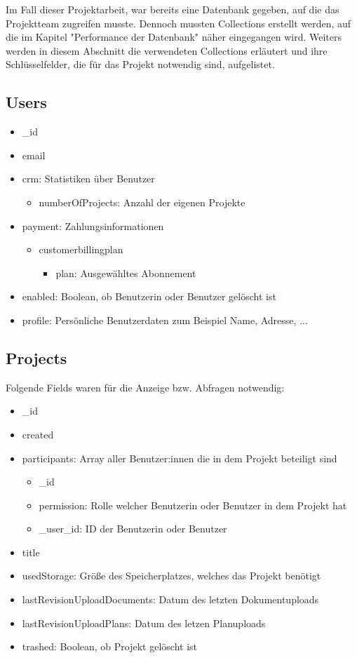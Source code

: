 Im Fall dieser Projektarbeit, war bereits eine Datenbank gegeben, auf die das Projektteam zugreifen musste. Dennoch mussten Collections erstellt werden, auf die im Kapitel "Performance der Datenbank" näher eingegangen wird. Weiters werden in diesem Abschnitt die verwendeten Collections erläutert und ihre Schlüsselfelder, die für das Projekt notwendig sind, aufgelistet.
\newpage
\subsection{Users}
\begin{itemize}
    \item \_id
    \item email
    \item crm: Statistiken über Benutzer
        \begin{itemize}
            \item numberOfProjects: Anzahl der eigenen Projekte
        \end{itemize}
    \item payment: Zahlungsinformationen
        \begin{itemize}
            \item customerbillingplan
            \begin{itemize}
                \item plan: Ausgewähltes Abonnement
            \end{itemize}
        \end{itemize}
    \item enabled: Boolean, ob Benutzerin oder Benutzer gelöscht ist
    \item profile: Persönliche Benutzerdaten zum Beispiel Name, Adresse, ...
\end{itemize}

\subsection{Projects}
Folgende Fields waren für die Anzeige bzw. Abfragen notwendig:
\begin{itemize}
    \item \_id
    \item created
    \item participants: Array aller Benutzer:innen die in dem Projekt beteiligt sind
        \begin{itemize}
            \item \_id
            \item permission: Rolle welcher Benutzerin oder Benutzer in dem Projekt hat
            \item \_user\_id: ID der Benutzerin oder Benutzer
        \end{itemize}
    \item title
    \item usedStorage: Größe des Speicherplatzes, welches das Projekt benötigt
    \item lastRevisionUploadDocuments: Datum des letzten Dokumentuploads
    \item lastRevisionUploadPlans: Datum des letzen Planuploads
    \item trashed: Boolean, ob Projekt gelöscht ist
\end{itemize}